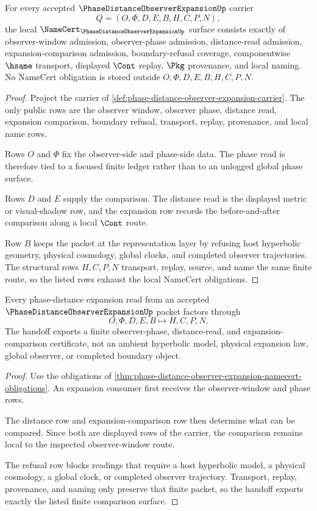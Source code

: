 \begin{theorem}
\label{thm:phase-distance-observer-expansion-namecert-obligations}
For every accepted $\PhaseDistanceObserverExpansionUp$ carrier
$$
Q=(O,\Phi,D,E,B,H,C,P,N),
$$
the local $\NameCert_{\PhaseDistanceObserverExpansionUp}$ surface consists exactly of observer-window admission, observer-phase admission, distance-read admission, expansion-comparison admission, boundary-refusal coverage, componentwise $\hsame$ transport, displayed $\Cont$ replay, $\Pkg$ provenance, and local naming. No NameCert obligation is stored outside $O,\Phi,D,E,B,H,C,P,N$.
\end{theorem}
\begin{proof}
Project the carrier of \autoref{def:phase-distance-observer-expansion-carrier}. The only public rows are the observer window, observer phase, distance read, expansion comparison, boundary refusal, transport, replay, provenance, and local name rows.

Rows $O$ and $\Phi$ fix the observer-side and phase-side data. The phase read is therefore tied to a focused finite ledger rather than to an unlogged global phase surface.

Rows $D$ and $E$ supply the comparison. The distance read is the displayed metric or visual-shadow row, and the expansion row records the before-and-after comparison along a local $\Cont$ route.

Row $B$ keeps the packet at the representation layer by refusing host hyperbolic geometry, physical cosmology, global clocks, and completed observer trajectories. The structural rows $H,C,P,N$ transport, replay, source, and name the same finite route, so the listed rows exhaust the local NameCert obligations.
\end{proof}

\begin{theorem}
\label{thm:phase-distance-observer-expansion-comparison-handoff}
Every phase-distance expansion read from an accepted $\PhaseDistanceObserverExpansionUp$ packet factors through
$$
O,\Phi,D,E,B \longmapsto H,C,P,N .
$$
The handoff exports a finite observer-phase, distance-read, and expansion-comparison certificate, not an ambient hyperbolic model, physical expansion law, global observer, or completed boundary object.
\end{theorem}
\begin{proof}
Use the obligations of \autoref{thm:phase-distance-observer-expansion-namecert-obligations}. An expansion consumer first receives the observer-window and phase rows.

The distance row and expansion-comparison row then determine what can be compared. Since both are displayed rows of the carrier, the comparison remains local to the inspected observer-window route.

The refusal row blocks readings that require a host hyperbolic model, a physical cosmology, a global clock, or completed observer trajectory. Transport, replay, provenance, and naming only preserve that finite packet, so the handoff exports exactly the listed finite comparison surface.
\end{proof}

